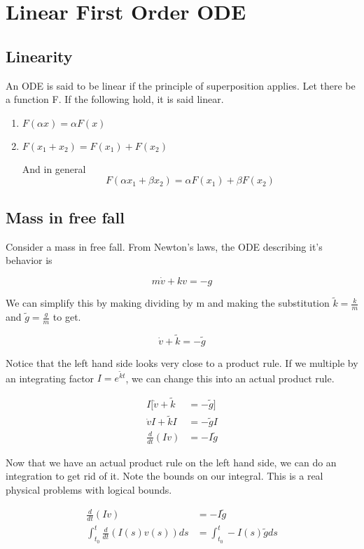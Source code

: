 \chapter{Linear First Order ODE}
%
%
%
%


\section{Linearity}

\begin{leftbar}
\begin{define}
	An ODE is said to be linear if the principle of superposition applies. Let there be a function F. If the following hold, it is said linear.
	\begin{enumerate}
		\item $F(\alpha x) = \alpha F(x)$
		\item $F(x_{1} + x_{2}) = F(x_{1}) + F(x_{2})$
		
	And in general
	\[
	F(\alpha x_{1} + \beta x_{2}) = \alpha F(x_{1}) + \beta F(x_{2})
	\]
	\end{enumerate}
\end{define}
\end{leftbar}

\section{Mass in free fall}
	Consider a mass in free fall. From Newton's laws, the ODE describing it's behavior is

\[
m\dot{v} + kv = -g
\]

We can simplify this by making dividing by m and making the substitution $\tilde{k} = \frac{k}{m}$ and $\tilde{g} = \frac{g}{m}$ to get.

\[
\dot{v}+\tilde{k}=-\tilde{g}
\]

Notice that the left hand side looks very close to a product rule. If we multiple by an integrating factor $I=e^{\tilde{k}t}$, we can change this into an actual product rule.

\[
\begin{aligned}
I[\dot{v}+\tilde{k} &= -\tilde{g}]\\
\dot{v}I+\tilde{k}I &= -\tilde{g}I\\
\frac{d}{dt}(Iv) &= -I\tilde{g}
\end{aligned}
\]

Now that we have an actual product rule on the left hand side, we can do an integration to get rid of it. Note the bounds on our integral. This is a real physical problems with logical bounds.

\[
\begin{aligned}
\frac{d}{dt}(Iv) &= -I\tilde{g}\\
\int_{t_{0}}^{t}\frac{d}{dt}(I(s)v(s))ds &= \int_{t_{0}}^{t}-I(s)\tilde{g}ds
\end{aligned}
\]
%